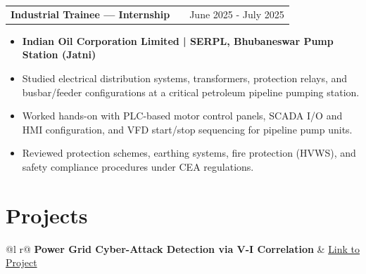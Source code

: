 \documentclass[a4paper,11pt]{article}
\makeatletter
\newenvironment{joblong}[2]
    {
    \begin{tabularx}{\linewidth}{@{}l X r@{}}
    \textbf{#1} & \hfill &  #2 \\[3.75pt]
    \end{tabularx}
    \begin{minipage}[t]{\linewidth}
    \begin{itemize}[nosep,after=\strut, leftmargin=1em, itemsep=3pt,label=--]
    }
    {
    \end{itemize}
    \end{minipage}    
    }
\makeatother
\begin{document}
\begin{joblong}{Industrial Trainee — Internship}{June 2025 - July 2025} 
\item[] \hspace{-1em}\textbf{Indian Oil Corporation Limited | SERPL, Bhubaneswar Pump Station (Jatni)}
\item Studied electrical distribution systems, transformers, protection relays, and busbar/feeder configurations at a critical petroleum pipeline pumping station.
\item Worked hands-on with PLC-based motor control panels, SCADA I/O and HMI configuration, and VFD start/stop sequencing for pipeline pump units.
\item Reviewed protection schemes, earthing systems, fire protection (HVWS), and safety compliance procedures under CEA regulations.
\end{joblong}
  
\section{Projects}

\begin{tabularx}{\linewidth}{ @{}l r@{} }
\textbf{Power Grid Cyber-Attack Detection via V-I Correlation} & \hfill \href{https://github.com/RustyUjjwal/Cyber-attack-and-physical-fault-differentiation.git}{Link to Project} \\[3.75pt]
 \\
\end{tabularx}

\end{document}
